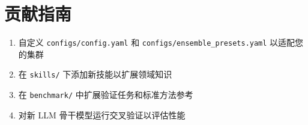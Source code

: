 \documentclass[12pt,a4paper]{ctexart}
\begin{document}
\section{贡献指南}

\begin{enumerate}[itemsep=4pt]
    \item 自定义 \texttt{configs/config.yaml} 和 \texttt{configs/ensemble\_presets.yaml} 以适配您的集群
    \item 在 \texttt{skills/} 下添加新技能以扩展领域知识
    \item 在 \texttt{benchmark/} 中扩展验证任务和标准方法参考
    \item 对新 LLM 骨干模型运行交叉验证以评估性能
\end{enumerate}
\end{document}
